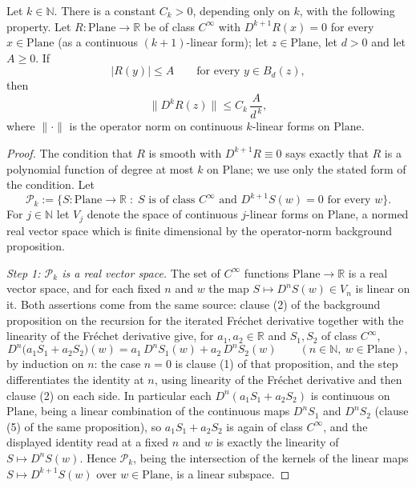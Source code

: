 \begin{lemma}
Let $k\in\mathbb{N}$.  There is a constant $C_k>0$, depending only on $k$, with the following
property.  Let $R\colon\mathrm{Plane}\to\mathbb{R}$ be of class $C^\infty$ with
$D^{k+1}R(x)=0$ for every $x\in\mathrm{Plane}$ (as a continuous $(k+1)$-linear form); let
$z\in\mathrm{Plane}$, let $d>0$ and let $A\ge0$.  If
\[
  \lvert R(y)\rvert\le A\qquad\text{for every }y\in B_d(z),
\]
then
\[
  \bigl\lVert D^{k}R(z)\bigr\rVert\le C_k\,\frac{A}{d^{\,k}},
\]
where $\lVert\cdot\rVert$ is the operator norm on continuous $k$-linear forms on
$\mathrm{Plane}$.
\end{lemma}
\begin{proof}
The condition that $R$ is smooth with $D^{k+1}R\equiv0$ says exactly that $R$ is a polynomial
function of degree at most $k$ on $\mathrm{Plane}$; we use only the stated form of the
condition.  Let
\[
  \mathcal{P}_k:=\bigl\{S\colon\mathrm{Plane}\to\mathbb{R}\;:\;
    S\text{ is of class }C^\infty\text{ and }D^{k+1}S(w)=0\text{ for every }w\bigr\}.
\]
For $j\in\mathbb{N}$ let $V_j$ denote the space of continuous $j$-linear forms on
$\mathrm{Plane}$, a normed real vector space which is finite dimensional by the
operator-norm background proposition.

\medskip\noindent\emph{Step 1: $\mathcal{P}_k$ is a real vector space.}
The set of $C^\infty$ functions $\mathrm{Plane}\to\mathbb{R}$ is a real vector space, and for
each fixed $n$ and $w$ the map $S\mapsto D^{n}S(w)\in V_n$ is linear on it.  Both assertions come
from the same source: clause (2) of the background proposition on the recursion for the iterated
Fr\'echet derivative together with the linearity of the Fr\'echet derivative give, for
$a_1,a_2\in\mathbb{R}$ and $S_1,S_2$ of class $C^{\infty}$,
\[
  D^{n}\bigl(a_1S_1+a_2S_2\bigr)(w)=a_1\,D^{n}S_1(w)+a_2\,D^{n}S_2(w)
  \qquad(n\in\mathbb{N},\ w\in\mathrm{Plane}),
\]
by induction on $n$: the case $n=0$ is clause (1) of that proposition, and the step differentiates
the identity at $n$, using linearity of the Fr\'echet derivative and then clause (2) on each side.
In particular each $D^{n}(a_1S_1+a_2S_2)$ is continuous on $\mathrm{Plane}$, being a linear
combination of the continuous maps $D^{n}S_1$ and $D^{n}S_2$ (clause (5) of the same
proposition), so $a_1S_1+a_2S_2$ is again of class $C^{\infty}$, and the displayed identity read at
a fixed $n$ and $w$ is exactly the linearity of $S\mapsto D^{n}S(w)$.  Hence $\mathcal{P}_k$,
being the intersection of the
kernels of the linear maps $S\mapsto D^{k+1}S(w)$ over $w\in\mathrm{Plane}$, is a linear
subspace.


\end{proof}
